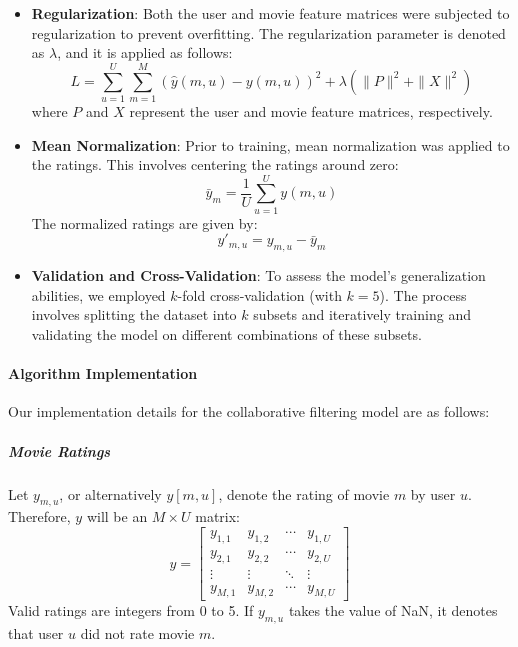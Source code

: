 \documentclass[a4paper,9pt]{article}
\begin{document}
\begin{itemize}
	\item \textbf{Regularization}: Both the user and movie feature matrices were subjected to regularization to prevent overfitting. The regularization parameter is denoted as \( \lambda \), and it is applied as follows:
	      \begin{equation}
		      L = \sum_{u=1}^{U} \sum_{m=1}^{M} \left( \hat{y}(m,u) - y(m,u) \right)^2 + \lambda \left( \|P\|^2 + \|X\|^2 \right) \tag{1}
	      \end{equation}
	      where \(P\) and \(X\) represent the user and movie feature matrices, respectively.

	\item \textbf{Mean Normalization}: Prior to training, mean normalization was applied to the ratings. This involves centering the ratings around zero:
	      \begin{equation}
		      \bar{y}_m = \frac{1}{U} \sum_{u=1}^{U} y(m,u) \tag{2}
	      \end{equation}
	      The normalized ratings are given by:
	      \begin{equation}
		      y'_{m,u} = y_{m,u} - \bar{y}_m \tag{3}
	      \end{equation}

	\item \textbf{Validation and Cross-Validation}: To assess the model’s generalization abilities, we employed \( k \)-fold cross-validation (with \( k = 5 \)). The process involves splitting the dataset into \( k \) subsets and iteratively training and validating the model on different combinations of these subsets.
\end{itemize}

\paragraph{Algorithm Implementation}
Our implementation details for the collaborative filtering model are as follows:

\subparagraph{Movie Ratings}
Let \( y_{m,u} \), or alternatively \( y[m,u] \), denote the rating of movie \( m \) by user \( u \). Therefore, \( y \) will be an \( M \times U \) matrix:
\begin{equation}
	y =
	\begin{bmatrix}
		y_{1,1} & y_{1,2} & \cdots & y_{1,U} \\
		y_{2,1} & y_{2,2} & \cdots & y_{2,U} \\
		\vdots  & \vdots  & \ddots & \vdots  \\
		y_{M,1} & y_{M,2} & \cdots & y_{M,U}
	\end{bmatrix} \tag{4}
\end{equation}
Valid ratings are integers from 0 to 5. If \( y_{m,u} \) takes the value of NaN, it denotes that user \( u \) did not rate movie \( m \).
\end{document}
